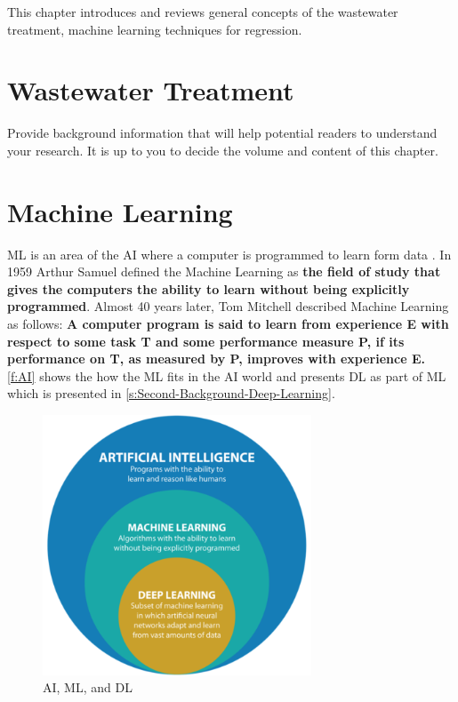 This chapter introduces and reviews general concepts of the wastewater treatment, machine learning techniques for regression.

\section{Wastewater Treatment}
\label{s:First-Background-Topic}

Provide background information that will help potential readers to understand your research. It is up to you to decide the volume and content of this chapter.



\section{Machine Learning}
\label{s:Second-Background-Topic}

\ac{ML} is an area of the \ac{AI} where a computer is programmed to learn form data \cite{Ray2019}. In 1959 Arthur Samuel defined the Machine Learning as \textbf{the field of study that gives the computers the ability to learn without being explicitly programmed}. Almost 40 years later, Tom Mitchell described Machine Learning as follows: \textbf{A computer program is said to learn from experience E with respect to some task T and some performance measure P, if its performance on T, as measured by P, improves with experience E.} \autoref{f:AI} \cite{raza_cinquergrana_2018} shows the how the \ac{ML} fits in the \ac{AI} world and presents \ac{DL} as part of \ac{ML} which is presented in \autoref{s:Second-Background-Deep-Learning}.

\begin{figure}[h]
\centering
\includegraphics[width=8cm]{figures/Ch2/AI-ML-DL.png}
\caption{AI, ML, and DL \cite{raza_cinquergrana_2018}}
\label{f:AI}
\end{figure}

